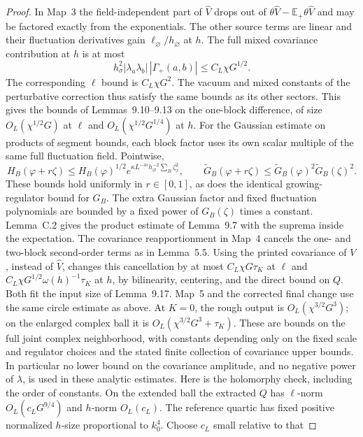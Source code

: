 \documentclass[11pt]{article}
\begin{document}
\begin{proof}
In Map~3 the field-independent part of \(\widehat V\)
drops out of
\(\theta\widehat V-\mathbb E_+\theta\widehat V\)
and may be factored exactly from the exponentials.
The other source terms are linear and their fluctuation
derivatives gain \(\ell_\varnothing/h_\varnothing\) at \(h\).
The full mixed covariance contribution at \(h\) is at
most
\[
 h_\sigma^2|\lambda_a\lambda_b|\,|\Gamma_+(a,b)|
   \le C_L\chi G^{1/2}.
\]
The corresponding \(\ell\) bound is \(C_L\chi G^2\).
The vacuum and mixed constants of the perturbative
correction thus satisfy the same bounds as its other
sectors. This gives the bounds of Lemmas~9.10--9.13 on
the one-block difference, of size
\(O_L(\chi^{1/2}G)\) at \(\ell\) and
\(O_L(\chi^{1/2}G^{1/4})\) at \(h\).
For the Gaussian estimate on products of segment
bounds, each block factor uses its own scalar multiple
of the same full fluctuation field. Pointwise,
\[
 H_B(\varphi+r\zeta)\le H_B(\varphi)^{1/2}
   e^{\kappa L^{-4s}h_\varnothing^{-2}\sum_B\zeta_x^2},
 \qquad
 \widetilde G_B(\varphi+r\zeta)
 \le \widetilde G_B(\varphi)^2\widetilde G_B(\zeta)^2 .
\]
These bounds hold uniformly in \(r\in[0,1]\), as does
the identical growing-regulator bound for \(G_B\).
The extra Gaussian factor and fixed fluctuation
polynomials are bounded by a fixed power of \(G_B(\zeta)\)
times a constant. Lemma~C.2 gives the product estimate
of Lemma~9.7 with the suprema inside the expectation.
The covariance reapportionment in Map~4 cancels the
one- and two-block second-order terms as in Lemma~5.5.
Using the printed covariance of \(V\), instead of
\(\widehat V\), changes this cancellation by at most
\(C_L\chi G\tau_K\) at \(\ell\) and
\(C_L\chi G^{1/2}\omega(h)^{-1}\tau_K\) at \(h\), by
bilinearity, centering, and the direct bound on \(Q\).
Both fit the input size of Lemma~9.17.
Map~5 and the corrected final change use the same
circle estimate as above. At \(K=0\), the rough output
is \(O_L(\chi^{3/2}G^3)\); on the enlarged complex ball
it is \(O_L(\chi^{3/2}G^3+\tau_K)\).
These are bounds on the full joint complex neighborhood, with
constants depending only on the fixed scale and regulator choices
and the stated finite collection of covariance upper bounds. In
particular no lower bound on the covariance amplitude, and no
negative power of \(\lambda\), is used in these analytic estimates.
Here is the holomorphy check, including the order of constants.
On the extended ball the extracted \(Q\) has \(\ell\)-norm
\(O_L(c_LG^{9/4})\) and \(h\)-norm \(O_L(c_L)\).
The reference quartic has fixed positive normalized \(h\)-size
proportional to \(k_0^4\). Choose \(c_L\) small relative to that

\end{proof}
\end{document}
